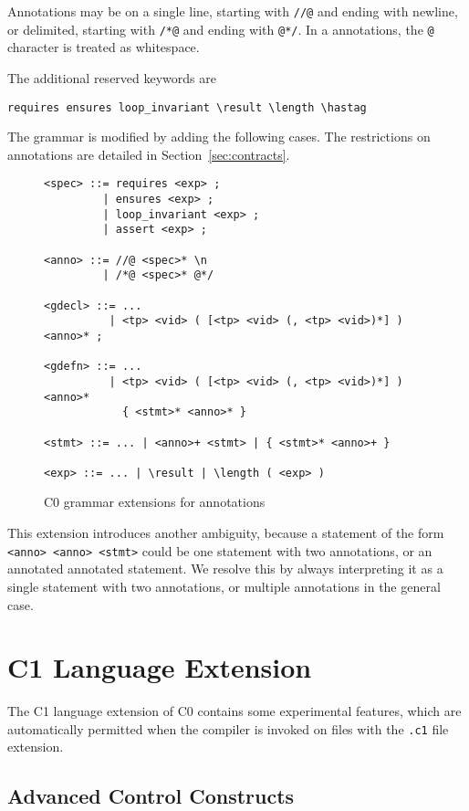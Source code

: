 \documentclass[11pt]{article}
\begin{document}
Annotations may be on a single line, starting with
\lstinline'//@' and ending with newline, or delimited,
starting with \lstinline'/*@' and ending with \lstinline'@*/'.
In a annotations, the \lstinline'@' character is treated
as whitespace.

The additional reserved keywords are
\begin{lstlisting}
requires ensures loop_invariant \result \length \hastag
\end{lstlisting}
The grammar is modified by adding the following cases.  The
restrictions on annotations are detailed in
Section~\ref{sec:contracts}.

\begin{figure}
\begin{lstlisting}[basicstyle=\smallbasicstyle]
<spec> ::= requires <exp> ;
         | ensures <exp> ;
         | loop_invariant <exp> ;
         | assert <exp> ;

<anno> ::= //@ <spec>* \n
         | /*@ <spec>* @*/

<gdecl> ::= ...
          | <tp> <vid> ( [<tp> <vid> (, <tp> <vid>)*] ) <anno>* ;

<gdefn> ::= ...
          | <tp> <vid> ( [<tp> <vid> (, <tp> <vid>)*] ) <anno>*
            { <stmt>* <anno>* }

<stmt> ::= ... | <anno>+ <stmt> | { <stmt>* <anno>+ }

<exp> ::= ... | \result | \length ( <exp> )
\end{lstlisting}
\caption{C0 grammar extensions for annotations}
\end{figure}

This extension introduces another ambiguity, because a statement of the
form \lstinline'<anno> <anno> <stmt>' could be one statement with two
annotations, or an annotated annotated statement.  We resolve this by
always interpreting it as a single statement with two annotations, or
multiple annotations in the general case.

\section{C1 Language Extension}
\label{sec:c1}

The C1 language extension of C0 contains some experimental features,
which are automatically permitted when the compiler is invoked on
files with the \lstinline'.c1' file extension.

\subsection{Advanced Control Constructs}
\end{document}
